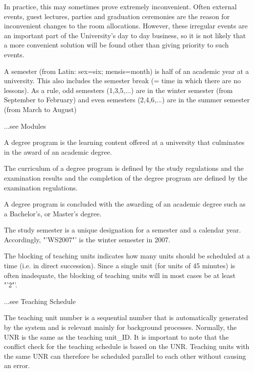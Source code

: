 {{In practice, this may sometimes prove extremely inconvenient. Often external events, guest lectures, parties and graduation ceremonies are the reason for inconvenient changes to the room allocations. However, these irregular events are an important part of the University's day to day business, so it is not likely that a more convenient solution will be found other than giving priority to such events.

A semester (from Latin: sex=six; mensis=month) is half of an academic year at a university. This also includes the semester break (= time in which there are no lessons).
As a rule, odd semesters (1,3,5,...) are in the winter semester (from September to February) and even semesters (2,4,6,...) are in the summer semester (from March to August) 

...see Modules

A degree program is the learning content offered at a university that culminates in the award of an academic degree. 

The curriculum of a degree program is defined by the study regulations and the examination results and the completion of the degree program are defined by the examination regulations. 

A degree program is concluded with the awarding of an academic degree such as a Bachelor's, or Master's degree.

The study semester is a unique designation for a semester and a calendar year.
Accordingly, "'WS2007"' is the winter semester in 2007.

The blocking of teaching units indicates how many units should be scheduled at a time (i.e. in direct succession). Since a single unit (for units of 45 minutes) is often inadequate, the blocking of teaching units will in most cases be at least "'2"'.

...see Teaching Schedule

The teaching unit number is a sequential number that is automatically generated by the system and is relevant mainly for background processes. Normally, the UNR is the same as the teaching unit\_ID. 
It is important to note that the conflict check for the teaching schedule is based on the UNR. Teaching units with the same UNR can therefore be scheduled parallel to each other without causing an error.

}}
